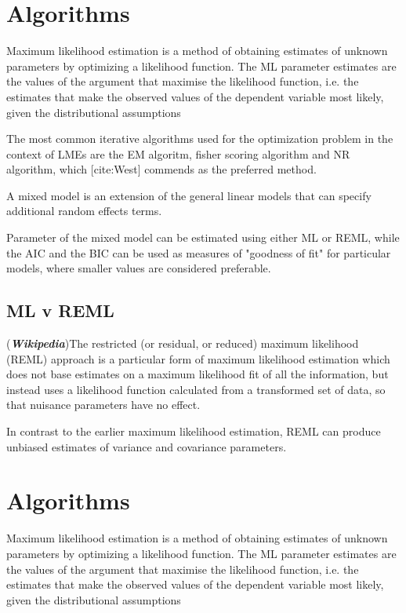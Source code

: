 \documentclass[Chap4amain.tex]{subfiles}
\begin{document}
\newpage

\section{Algorithms}
Maximum likelihood estimation is a method of obtaining estimates
of unknown parameters by optimizing a likelihood function. The ML
parameter estimates are the values of the argument that maximise
the likelihood function, i.e. the estimates that make the observed
values of the dependent variable most likely, given the
distributional assumptions

The most common iterative algorithms used for the optimization
problem in the context of LMEs are the EM algoritm, fisher scoring
algorithm and NR algorithm, which [cite:West] commends as the
preferred method.

A mixed model is an extension of the general linear models that
can specify additional random effects terms.

Parameter of the mixed model can be estimated using either ML or
REML, while the AIC and the BIC can be used as measures of
"goodness of fit" for particular models, where smaller values are
considered preferable.


\newpage

\subsection{ML v REML}
(\textbf{\emph{Wikipedia}})The restricted (or residual, or reduced) maximum likelihood (REML) approach is a particular form of maximum likelihood estimation which does not base estimates on a maximum likelihood fit of all the information, but instead uses a likelihood function calculated from a transformed set of data, so that nuisance parameters have no effect.

In contrast to the earlier maximum likelihood estimation, REML can produce unbiased estimates of variance and covariance parameters.

\newpage
\section{Algorithms}
Maximum likelihood estimation is a method of obtaining estimates
of unknown parameters by optimizing a likelihood function. The ML
parameter estimates are the values of the argument that maximise
the likelihood function, i.e. the estimates that make the observed
values of the dependent variable most likely, given the
distributional assumptions
\end{document}
